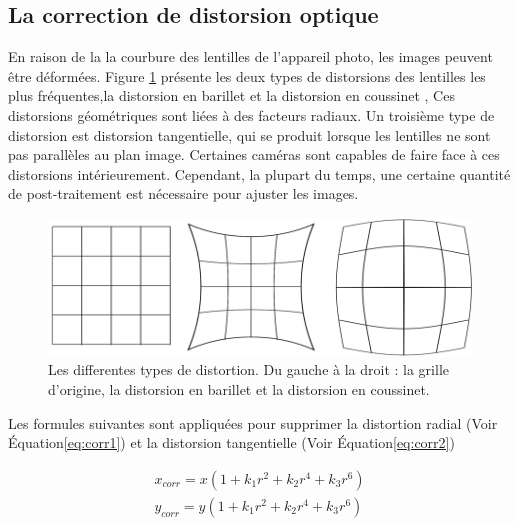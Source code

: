 \documentclass[
]{article}
\begin{document}
\hypertarget{la-correction-de-distorsion-optique}{%
\subsection*{La correction de distorsion optique}\label{la-correction-de-distorsion-optique}}

En raison de la la courbure des lentilles de l'appareil photo, les images peuvent être déformées. Figure \ref{fig:flens} présente les deux types de distorsions des lentilles les plus fréquentes,la distorsion en barillet et la distorsion en coussinet \citep{fryer_lens_1986} , Ces distorsions géométriques sont liées à des facteurs radiaux. Un troisième type de distorsion est distorsion tangentielle, qui se produit lorsque les lentilles ne sont pas parallèles au plan
image. Certaines caméras sont capables de faire face à ces distorsions
intérieurement. Cependant, la plupart du temps, une certaine quantité de post-traitement est
nécessaire pour ajuster les images.



\begin{figure}[H]
\includegraphics[width=1\linewidth,]{images/lens} \caption{Les differentes types de distortion. Du gauche à la droit : la grille d'origine, la distorsion en barillet et la distorsion en coussinet.}\label{fig:flens}
\end{figure}

Les formules suivantes sont appliquées pour supprimer la distortion radial (Voir Équation\eqref{eq:corr1}) et la distorsion tangentielle (Voir Équation\eqref{eq:corr2})

\begin{equation}
\begin{aligned}
  x_{corr} = x\left(1+k_1r^2+k_2r^4+k_3r^6\right)
  \\y_{corr} = y\left(1+k_1r^2+k_2r^4+k_3r^6\right)
\end{aligned}
 \label{eq:corr1}
\end{equation}
\end{document}
